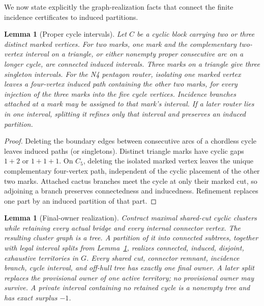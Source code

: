 \documentclass[11pt]{article}
\newtheorem{lemma}[theorem]{Lemma}
\begin{document}
We now state explicitly the graph-realization facts that connect the finite
incidence certificates to induced partitions.

\begin{lemma}[Proper cycle intervals]\label{lem:interval}
Let $C$ be a cyclic block carrying two or three distinct marked vertices.  For
two marks, one mark and the complementary two-vertex interval on a triangle,
or either nonempty proper consecutive arc on a longer cycle, are connected
induced intervals.  Three marks on a triangle give three singleton intervals.
For the N4 pentagon router, isolating one marked vertex leaves a four-vertex
induced path containing the other two marks, for every injection of the three
marks into the five cycle vertices.  Incidence branches attached at a mark may
be assigned to that mark's interval.  If a later router lies in one interval,
splitting it refines only that interval and preserves an induced partition.
\end{lemma}

\begin{proof}
Deleting the boundary edges between consecutive arcs of a chordless cycle
leaves induced paths (or singletons).  Distinct triangle marks have cyclic gaps
$1+2$ or $1+1+1$.  On $C_5$, deleting the isolated marked vertex leaves the
unique complementary four-vertex path, independent of the cyclic placement of
the other two marks.  Attached cactus branches meet the cycle at only their
marked cut, so adjoining a branch preserves connectedness and inducedness.
Refinement replaces one part by an induced partition of that part.
\end{proof}

\begin{lemma}[Final-owner realization]\label{lem:ownership}
Contract maximal shared-cut cyclic clusters while retaining every actual
bridge and every internal connector vertex.  The resulting cluster graph is a
tree.  A partition of it into connected subtrees, together with legal interval
splits from Lemma~\ref{lem:interval}, realizes connected, induced, disjoint,
exhaustive territories in $G$.  Every shared cut, connector remnant, incidence
branch, cycle interval, and off-hull tree has exactly one final owner.  A later
split replaces the provisional owner of one active territory; no provisional
owner may survive.  A private interval containing no retained cycle is a
nonempty tree and has exact surplus $-1$.
\end{lemma}
\end{document}
